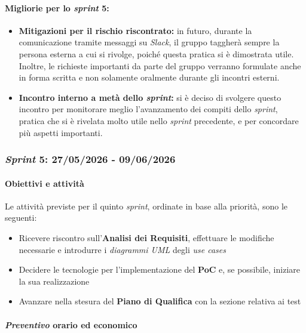 \documentclass[12pt, a4paper]{article}
\begin{document}
{\paragraph{Migliorie per lo \textit{sprint} 5:}
\begin{itemize}
    \item \textbf{Mitigazioni per il rischio riscontrato:} in futuro, durante la comunicazione tramite messaggi su \textit{Slack}, il gruppo taggherà sempre la persona esterna a cui si rivolge, poiché questa pratica si è dimostrata utile. Inoltre, le richieste importanti da parte del gruppo verranno formulate anche in forma scritta e non solamente oralmente durante gli incontri esterni.
    \item \textbf{Incontro interno a metà dello \textit{sprint}:} 
    si è deciso di svolgere questo incontro per monitorare meglio l’avanzamento dei compiti dello \textit{sprint}, pratica che si è rivelata molto utile nello \textit{sprint} precedente, e per concordare più aspetti importanti.
\end{itemize}


\subsubsection{\textit{Sprint} 5: 27/05/2026 - 09/06/2026}

\paragraph{Obiettivi e attività}

Le attività previste per il quinto \textit{sprint}, ordinate in base alla priorità, sono le seguenti:

\begin{itemize}
    \item Ricevere riscontro sull'\textbf{Analisi dei Requisiti}, effettuare le modifiche necessarie e introdurre i \textit{diagrammi UML} degli \textit{use cases}
    \item Decidere le tecnologie per l'implementazione del \textbf{PoC} e, se possibile, iniziare la sua realizzazione
    \item Avanzare nella stesura del \textbf{Piano di Qualifica} con la sezione relativa ai test
\end{itemize}

\paragraph{\textit{Preventivo} orario ed economico}

}
\end{document}
